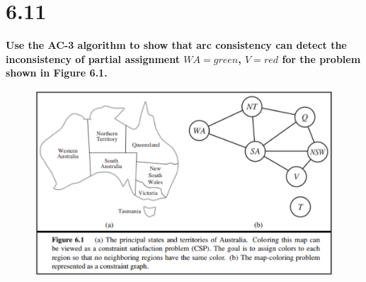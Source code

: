 \documentclass[UTF8]{article}
\begin{document}
\section*{6.11}
\noindent \textbf{Use the AC-3 algorithm to show that arc consistency can detect the inconsistency of partial assignment $WA=green$, $V=red$ for the problem shown in Figure 6.1.}
\begin{figure}[H]
\centering
\includegraphics[width=\linewidth*2/3]{image/figure6.1.png}
\end{figure}
\end{document}
